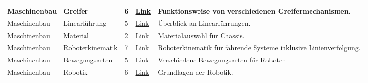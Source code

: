 \documentclass[main.tex]{subfiles} %
\begin{document}
\begin{longtable}{@{} L{2.5cm} L{2.9cm} C{1cm} L{1.2cm} L{6cm} @{}}
Maschinenbau & Greifer & 6 & \href{https://automationspraxis.industrie.de/handling/greifer-fuer-roboter-grundlagen-funktion-und-hersteller/}{Link} & Funktionsweise von verschiedenen Greifermechanismen. \\
\hline
Maschinenbau & Linearführung & 5 & \href{https://blog.item24.com/automatisierte-produktion/mit-lineartechnik-automation-einfach-umsetzen/}{Link} & Überblick an Linearführungen. \\
\hline
Maschinenbau & Material & 2 & \href{https://www.evsint.com/de/materials-to-build-a-robot/}{Link} & Materialauswahl für Chassis. \\
\hline
Maschinenbau & Roboterkinematik & 7 & \href{https://www-home.htwg-konstanz.de/\~{}bittel/msi\_robo/Vorlesung/02\_Roboterkinematik.pdf}{Link} & Roboterkinematik für fahrende Systeme inklusive Linienverfolgung. \\
\hline
Maschinenbau & Bewegungsarten & 5 & \href{https://www.scinexx.de/dossierartikel/rollen-oder-laufen/}{Link} & Verschiedene Bewegungsarten für Roboter. \\
\hline
Maschinenbau & Robotik & 6 & \href{https://www.hs-koblenz.de/fileadmin/media/profiles/ingenieurwesen\_elektrotechnik\_und\_informationstechnik/ross/ROB/Material/handout.pdf}{Link} & Grundlagen der Robotik. \\
\end{longtable}
\end{document}
